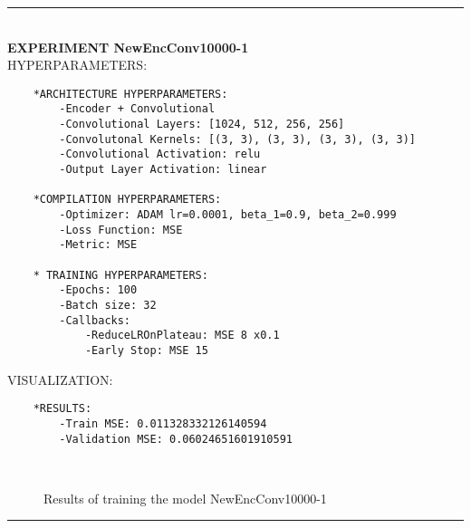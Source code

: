 \rule{0.5\textwidth}{0.5pt}\\

	{\large \textbf{EXPERIMENT NewEncConv10000-1}}\\
	
	{\normalsize HYPERPARAMETERS:}
	\begin{lstlisting}	
	*ARCHITECTURE HYPERPARAMETERS:
		-Encoder + Convolutional
		-Convolutional Layers: [1024, 512, 256, 256]
		-Convolutonal Kernels: [(3, 3), (3, 3), (3, 3), (3, 3)]
		-Convolutional Activation: relu
		-Output Layer Activation: linear
	
	*COMPILATION HYPERPARAMETERS:
		-Optimizer: ADAM lr=0.0001, beta_1=0.9, beta_2=0.999
		-Loss Function: MSE
		-Metric: MSE
	
	* TRAINING HYPERPARAMETERS:
		-Epochs: 100
		-Batch size: 32
		-Callbacks:
			-ReduceLROnPlateau: MSE 8 x0.1
			-Early Stop: MSE 15
	\end{lstlisting}
	
	{\normalsize VISUALIZATION:}
	\begin{lstlisting}
	*RESULTS:
        -Train MSE: 0.011328332126140594
        -Validation MSE: 0.06024651601910591
	\end{lstlisting}
	
	\begin{figure*}[ht!]
		\hspace{\fill}
		\hspace{\fill}
		\\
		\caption{Results of training the model NewEncConv10000-1}
	\end{figure*}
	
\FloatBarrier	
\rule{0.5\textwidth}{0.5pt}\\